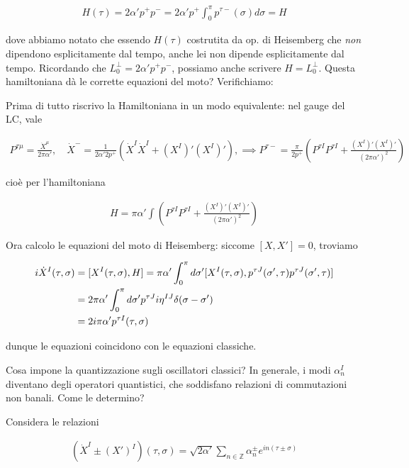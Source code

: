 \documentclass{report}
\begin{document}
\begin{align}
    H(\tau) = 2\alpha' p^+ p^-= 2\alpha' p^+ \int_0^\pi p^{\tau -}(\sigma) d\sigma = H
\end{align}

dove abbiamo notato che essendo \(H(\tau)\) costrutita da op. di Heisemberg che \emph{non} dipendono esplicitamente dal tempo, anche lei non dipende esplicitamente dal tempo. Ricordando che \(L_0^\perp = 2\alpha' p^+ p^-\), possiamo anche scrivere \(H = L_0^\perp\). Questa hamiltoniana dà le corrette equazioni del moto? Verifichiamo: 

Prima di tutto riscrivo la Hamiltoniana in un modo equivalente: nel gauge del LC, vale 

\begin{align}
    P^{\tau \mu} = \frac{\dot{X}^\mu}{2\pi\alpha'}, \quad \dot{X}^- = \frac{1}{2\alpha' 2p^+}(\dot{X}^I \dot{X}^I + (X^I)'(X^I)'), \implies P^{\tau -} = \frac{\pi}{2p^+}\left(P^{\tau I}P^{\tau I} + \frac{(X^I)'(X^I)'}{(2\pi\alpha')^2} \right)
\end{align}

cioè per l'hamiltoniana 

\begin{align}
    H = \pi \alpha' \int \left(P^{\tau I}P^{\tau I} + \frac{(X^I)'(X^I)'}{(2\pi\alpha')^2} \right)
\end{align}

Ora calcolo le equazioni del moto di Heisemberg: siccome \([X, X'] =0\), troviamo 

\begin{align}
    i\dot{X}^I (\tau, \sigma) &= [X^I (\tau, \sigma), H] = \pi\alpha' \int_0^\pi d\sigma' [X^I(\tau, \sigma), p^{\tau J}(\sigma', \tau)p^{\tau J}(\sigma', \tau)] \notag \\
    &= 2\pi \alpha' \int_0^\pi d\sigma' p^{\tau J} i \eta^{IJ} \delta (\sigma - \sigma') \notag \\
    &= 2i\pi \alpha' p^{\tau I}(\tau, \sigma)
\end{align}

dunque le equazioni coincidono con le equazioni classiche. 

Cosa impone la quantizzazione sugli oscillatori classici? In generale, i modi \(\alpha_n^I\) diventano degli operatori quantistici, che soddisfano relazioni di commutazioni non banali. Come le determino? 

Considera le relazioni 

\begin{align}
    (\dot{X}^I \pm (X')^I)(\tau, \sigma) = \sqrt{2\alpha'}\sum_{n \in \mathbb{Z}} \alpha_n^{\pm} e^{in (\tau \pm \sigma)}
\end{align}
\end{document}
